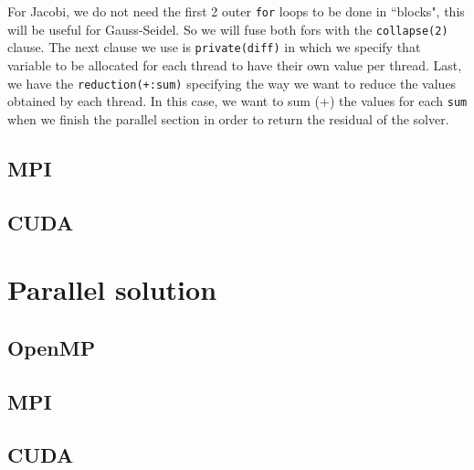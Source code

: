 \documentclass[a4paper, 10pt]{article}
\begin{document}
  For Jacobi, we do not need the first 2 outer \texttt{for} loops to be done in ``blocks", this will be useful for Gauss-Seidel. So we will fuse both fors with the \texttt{collapse(2)} clause. The next clause we use is \texttt{private(diff)} in which we specify that variable to be allocated for each thread to have their own value per thread. Last, we have the \texttt{reduction(+:sum)} specifying the way we want to reduce the values obtained by each thread. In this case, we want to sum (+) the values for each \texttt{sum} when we finish the parallel section in order to return the residual of the solver.


\subsection{MPI}

\subsection{CUDA}

\section{Parallel solution}

\subsection{OpenMP}

\subsection{MPI}

\subsection{CUDA}
\end{document}
